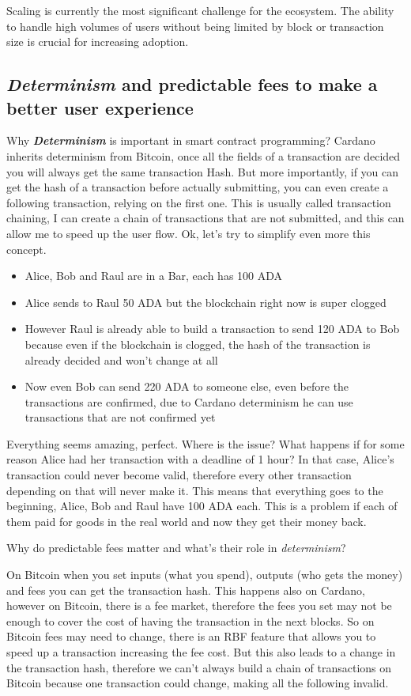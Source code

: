 Scaling is currently the most significant challenge for the ecosystem. The ability to handle high volumes of users without being limited by block or transaction size is crucial for increasing adoption.

\subsection{\textit{Determinism} and predictable fees to make a better user experience}
Why \textbf{\textit{Determinism}} is important in smart contract programming? 
Cardano inherits determinism from Bitcoin, once all the fields of a transaction are decided you will always get the same transaction Hash.
But more importantly, if you can get the hash of a transaction before actually submitting, you can even create a following transaction, relying on the first one.
This is usually called transaction chaining, I can create a chain of transactions that are not submitted, and this can allow me to speed up the user flow.
Ok, let's try to simplify even more this concept.
\begin{itemize}
    \item Alice, Bob and Raul are in a Bar, each has 100 ADA
    \item Alice sends to Raul 50 ADA but the blockchain right now is super clogged
    \item However Raul is already able to build a transaction to send 120 ADA to Bob because even if the blockchain is clogged, the hash of the transaction is already decided and won't change at all
    \item Now even Bob can send 220 ADA to someone else, even before the transactions are confirmed, due to Cardano determinism he can use transactions that are not confirmed yet
\end{itemize}

Everything seems amazing, perfect. Where is the issue?
What happens if for some reason Alice had her transaction with a deadline of 1 hour?
In that case, Alice's transaction could never become valid, therefore every other transaction depending on that will never make it.
This means that everything goes to the beginning, Alice, Bob and Raul have 100 ADA each. This is a problem if each of them paid for goods in the real world and now they get their money back.

Why do predictable fees matter and what's their role in \textit{determinism}?

On Bitcoin when you set inputs (what you spend), outputs (who gets the money) and fees you can get the transaction hash.
This happens also on Cardano, however on Bitcoin, there is a fee market, therefore the fees you set may not be enough to cover the cost of having the transaction in the next blocks.
So on Bitcoin fees may need to change, there is an RBF feature that allows you to speed up a transaction increasing the fee cost.
But this also leads to a change in the transaction hash, therefore we can't always build a chain of transactions on Bitcoin because one transaction could change, making all the following invalid.

